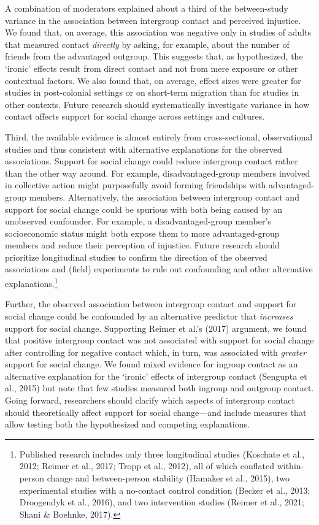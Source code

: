 \documentclass[12pt, letterpaper]{article}
\begin{document}
A combination of moderators explained about a third of the between-study
variance in the association between intergroup contact and perceived
injustice. We found that, on average, this association was negative only
in studies of adults that measured contact \emph{directly} by asking,
for example, about the number of friends from the advantaged outgroup.
This suggests that, as hypothesized, the `ironic' effects result from
direct contact and not from mere exposure or other contextual factors.
We also found that, on average, effect sizes were greater for studies in
post-colonial settings or on short-term migration than for studies in
other contexts. Future research should systematically investigate
variance in how contact affects support for social change across
settings and cultures.

Third, the available evidence is almost entirely from cross-sectional,
observational studies and thus consistent with alternative explanations
for the observed associations. Support for social change could reduce
intergroup contact rather than the other way around. For example,
disadvantaged-group members involved in collective action might
purposefully avoid forming friendships with advantaged-group members.
Alternatively, the association between intergroup contact and support
for social change could be spurious with both being caused by an
unobserved confounder. For example, a disadvantaged-group member's
socioeconomic status might both expose them to more advantaged-group
members and reduce their perception of injustice. Future research should
prioritize longitudinal studies to confirm the direction of the observed
associations and (field) experiments to rule out confounding and other
alternative explanations.\footnote{Published research includes only
  three longitudinal studies (Koschate et al., 2012; Reimer et al.,
  2017; Tropp et al., 2012), all of which conflated within-person change
  and between-person stability (Hamaker et al., 2015), two experimental
  studies with a no-contact control condition (Becker et al., 2013;
  Droogendyk et al., 2016), and two intervention studies (Reimer et al.,
  2021; Shani \& Boehnke, 2017).}

Further, the observed association between intergroup contact and support
for social change could be confounded by an alternative predictor that
\emph{increases} support for social change. Supporting Reimer et al.'s
(2017) argument, we found that positive intergroup contact was not
associated with support for social change after controlling for negative
contact which, in turn, was associated with \emph{greater} support for
social change. We found mixed evidence for ingroup contact as an
alternative explanation for the `ironic' effects of intergroup contact
(Sengupta et al., 2015) but note that few studies measured both ingroup
and outgroup contact. Going forward, researchers should clarify which
aspects of intergroup contact should theoretically affect support for
social change---and include measures that allow testing both the
hypothesized and competing explanations.
\end{document}
